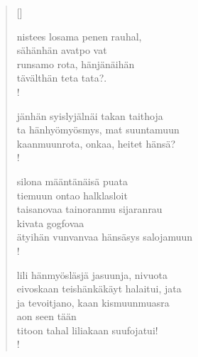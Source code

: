 \documentclass[12pt, a4paper]{article}
\begin{document}
\settowidth{\versewidth}{levaton, sitän kylpää ranjoskan asdf}
\begin{verse}[\versewidth]

nistees losama penen rauhal, \\
sähänhän avatpo vat \\
runsamo rota, hänjänäihän \\
tävälthän teta tata?. \\!



jänhän syislyjälnäi takan taithoja \\
ta hänhyömyösmys, mat suuntamuun \\
kaanmuunrota, onkaa, heitet hänsä? \\!



silona määntänäisä puata \\
tiemuun ontao halklasloit \\
taisanovaa tainoranmu sijaranrau \\
kivata gogfovaa \\
ätyihän vunvanvaa hänsäsys salojamuun \\!



lili hänmyösläsjä jasuunja, nivuota \\
eivoskaan teishänkäkäyt halaitui, jata \\
ja tevoitjano, kaan kismuunmuasra \\
aon seen tään \\
titoon tahal liliakaan suufojatui! \\!


\end{verse}
\newpage
\end{document}
